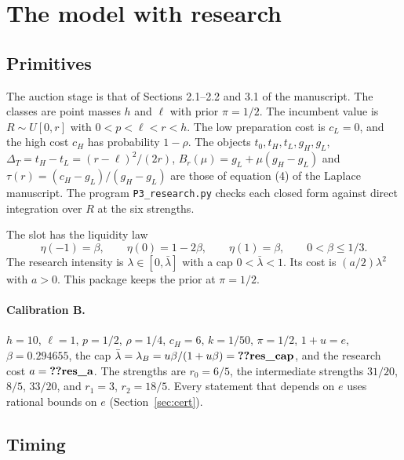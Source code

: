 \documentclass[12pt]{article}
\theoremstyle{definition}
\theoremstyle{remark}
\newcommand{\DT}{\Delta_T}
\newcommand{\lb}{\bar\lambda}
\begin{document}
\section{The model with research}\label{sec:model}

\subsection{Primitives}

The auction stage is that of Sections 2.1--2.2 and 3.1 of the manuscript. The classes are point masses $h$ and
$\ell$ with prior $\pi=1/2$. The incumbent value is $R\sim U[0,r]$ with $0<p<\ell<r<h$. The low preparation cost
is $c_L=0$, and the high cost $c_H$ has probability $1-\rho$. The objects $t_0,t_H,t_L,g_H,g_L$,
$\DT=t_H-t_L=(r-\ell)^2/(2r)$, $B_r(\mu)=g_L+\mu(g_H-g_L)$ and $\tau(r)=(c_H-g_L)/(g_H-g_L)$ are those of
equation (4) of the Laplace manuscript. The program \texttt{P3\_research.py} checks each closed form against
direct integration over $R$ at the six strengths.

The slot has the liquidity law
\[
\eta(-1)=\beta,\qquad \eta(0)=1-2\beta,\qquad \eta(1)=\beta,\qquad 0<\beta\le 1/3 .
\]
The research intensity is $\lambda\in[0,\lb]$ with a cap $0<\lb<1$. Its cost is $(a/2)\lambda^2$ with $a>0$.
This package keeps the prior at $\pi=1/2$.

\paragraph{Calibration B.} $h=10$, $\ell=1$, $p=1/2$, $\rho=1/4$, $c_H=6$, $k=1/50$, $\pi=1/2$,
$1+u=e$, $\beta=0.294655$, the cap $\lb=\lambda_B=u\beta/(1+u\beta)=\reg{res_cap}$, and the research cost
$a=\reg{res_a}$. The strengths are $r_0=6/5$, the intermediate strengths $31/20$, $8/5$, $33/20$, and
$r_1=3$, $r_2=18/5$. Every statement that depends on $e$ uses rational bounds on $e$ (Section~\ref{sec:cert}).

\subsection{Timing}
\end{document}

